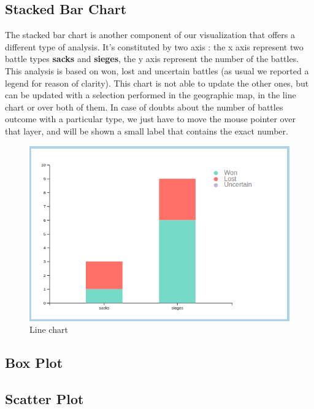 \subsection{Stacked Bar Chart}
The stacked bar chart is another component of our visualization that offers a different type of analysis. It's constituted by two axis : the x axis represent two battle types \textbf{sacks} and \textbf{sieges}, the y axis represent the number of the battles. This analysis is based on won, lost and uncertain battles (as usual we reported a legend for reason of clarity). This chart is not able to update the other ones, but can be updated with a selection performed in the geographic map, in the line chart or over both of them. In case of doubts about the number of battles outcome with a particular type, we just have to move the mouse pointer over that layer, and will be shown a small label that contains the exact number.
\begin{figure}[h]
\centering
\includegraphics[scale=0.30]{./images/stacked_bar_chart.png}
\caption{Line chart}
\end{figure}

\subsection{Box Plot}

\subsection{Scatter Plot}

